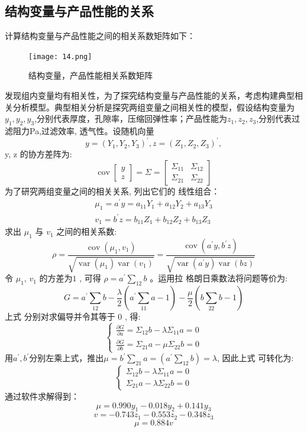 \documentclass[withoutpreface,bwprint]{cumcmthesis} %
\begin{document}
\subsection{结构变量与产品性能的关系}
计算结构变量与产品性能之间的相关系数矩阵如下：
   \begin{figure}[H]
	\centering
	\texttt{[image: 14.png]}	
	\caption{结构变量，产品性能相关系数矩阵}
	\label{11}
\end{figure}
发现组内变量均有相关性，为了探究结构变量与产品性能的关系，考虑构建典型相关分析模型。典型相关分析是探究两组变量之间相关性的模型，假设结构变量为$y_1,y_2,y_3$,分别代表厚度，孔隙率，压缩回弹性率；产品性能为$z_1,z_2,z_3$,分别代表过滤阻力Pa,过滤效率, 透气性。设随机向量 $$ y=\left(Y_{1}, Y_{2} , Y_{3}\right)^{\prime}, z=\left(Z_{1}, Z_{2}, Z_{3}\right)^{\prime} ,$$
y, z  的协方差阵为:
$$\operatorname{cov}\left[\begin{array}{l}
	y \\
	z
\end{array}\right]=\Sigma=\left[\begin{array}{ll}
	\Sigma_{11} & \Sigma_{12} \\
	\Sigma_{21} & \Sigma_{22}
\end{array}\right]$$
为了研究两组变量之间的相关关系, 列出它们的 线性组合：
$$\begin{array}{l}
	\mu_{1}=a^{\prime} y=a_{11} Y_{1}+a_{12} Y_{2}+a_{1 3} Y_{3} \\
	v_{1}=b^{\prime} z=b_{11} Z_{1}+b_{12} Z_{2}+b_{1 3} Z_{3}
\end{array}$$
求出  $\mu_{1}$  与  $v_{1}$  之间的相关系数:
$$\rho=\frac{\operatorname{cov}\left(\mu_{1}, v_{1}\right)}{\sqrt{\operatorname{var}\left(\mu_{1}\right) \operatorname{var}\left(v_{1}\right)}}=\frac{\operatorname{cov}\left(a^{\prime} y, b^{\prime} z\right)}{\sqrt{\operatorname{var}\left(a^{\prime} y\right) \operatorname{var}(b z)}} $$
令  $\mu_{1}$, $v_{1}$  的方差为$ 1$ , 可得 $ \rho=a^{\prime} \sum_{12} b $ 。运用拉 格朗日乘数法将问题等价为:
$$G=a^{\prime} \sum_{12} b-\frac{\lambda}{2}\left(a^{\prime} \sum_{11} a-1\right)-\frac{\mu}{2}\left(b \sum_{22} b-1\right)$$
上式 分别对求偏导并令其等于 0 , 得:
$$\left\{\begin{array}{l}
	\frac{\partial G}{\partial a}=\Sigma_{12} b-\lambda \Sigma_{11} a=0 \\
	\frac{\partial G}{\partial b}=\Sigma_{21} a-\mu \Sigma_{22} b=0
\end{array}\right.
$$
$\text{用} a^{\prime},b^{\prime} \text{分别左乘上式，推出} \mu=b^{\prime} \sum_{21} a=\left(a^{\prime} \sum_{12} b\right)=\lambda$, 因此上式 可转化为:
$$\left\{\begin{array}{l}
	\Sigma_{12} b-\lambda \Sigma_{11} a=0 \\
	\Sigma_{21} a-\lambda \Sigma_{22} b=0
\end{array}\right.$$
通过软件求解得到：
$$\mu = 0.990y_1-0.018y_2+0.141y_3$$
$$ v  =-0.743z_1-0.553z_2-0.348z_3$$
$$\mu=0.884v$$
\end{document}
